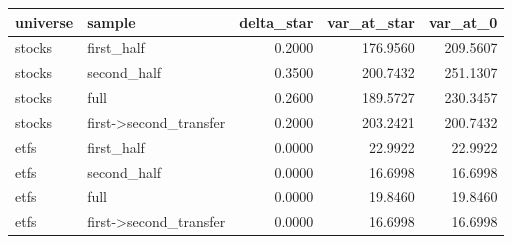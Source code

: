 \begin{tabular}{llrrr}
\toprule
universe & sample & delta_star & var_at_star & var_at_0 \\
\midrule
stocks & first_half & 0.2000 & 176.9560 & 209.5607 \\
stocks & second_half & 0.3500 & 200.7432 & 251.1307 \\
stocks & full & 0.2600 & 189.5727 & 230.3457 \\
stocks & first->second_transfer & 0.2000 & 203.2421 & 200.7432 \\
etfs & first_half & 0.0000 & 22.9922 & 22.9922 \\
etfs & second_half & 0.0000 & 16.6998 & 16.6998 \\
etfs & full & 0.0000 & 19.8460 & 19.8460 \\
etfs & first->second_transfer & 0.0000 & 16.6998 & 16.6998 \\
\bottomrule
\end{tabular}
